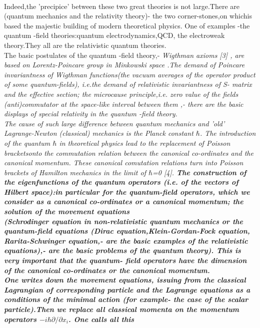 \documentclass[a4paper,12pt] {article}
\begin{document}
\\Indeed,the 'precipice' between these two great theories is not large.There are
 (quantum mechanics and the  relativity theory)- the two corner-stones,on whichis based the majestic building of  modern theoretical physics.
 One of examples -the quantum -field theories:quantum electrodynamics,QCD, the electroweak theory.They all are the relativistic quantum theories.
\\The basic postulates of the quantum -field theory,-  \it  Wigthman axioms \rm [3] , are based on
Lorentz-Poincare group in Minkowski space
.The demand of Poincare invariantness of \it Wigthman functions\rm (the vacuum averages of the operator product of some quantum-fields),
i.e.the  demand of relativistic invariantness of S- matrix and  the effective section; \it the microcause  principle\rm,i.e.  zero value of the fields (anti)commutator at the space-like interval between them ,-
there are the basic displays  of special relativity in the quantum -field theory.
\\The cause of such large difference between quantum mechanics and  'old'  Lagrange-Newton  (classical)
  mechanics is the Planck constant $\hbar$. \rm The introduction of the quantum  $\hbar$
in  theoretical physics  lead to the replacement of  \it Poisson brackets\rm onto  the \it commutation \rm relation between
 the canonical co-ordinates and the canonical momentum.
These \it canonical comutation relations \rm turn  into  Poisson brackets of Hamilton mechanics in the
 limit of  $\hbar$=0
[4]. \bf The construction of the eigenfunctions of the quantum operators (i.e. of the vectors of Hilbert
space):in particular for the quantum-field operators, which we consider as a canonical  co-ordinates or a
 canonical momentum; the solution of the movement equations \\(Schrodinger equation in non-relativistic
 quantum mechanics or the quantum-field equations (Dirac equation,Klein-Gordan-Fock equation,
Rarita-Schwinger equation,- are the basic examples of the relativistic equations),- are the basic problems
of the quantum theory)\rm  . This is very important that the quantum- field operators have the dimension
of the canonical co-ordinates or the canonical momentum.\\ One writes  down the movement equations,
issuing from the classical Lagrangian of corresponding particle and the Lagrange equations as a
conditions of the minimal action  (for example- the case of the scalar particle).Then we replace  all  \it
classical \rm   momenta on the momentum operators $-i\hbar\partial/\partial x_i$. One calls all this
\end{document}
